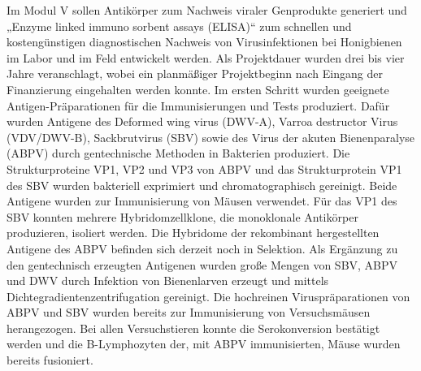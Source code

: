 Im Modul V sollen Antikörper zum Nachweis viraler Genprodukte generiert und „Enzyme linked immuno sorbent assays (ELISA)“ zum schnellen und kostengünstigen diagnostischen Nachweis von Virusinfektionen bei Honigbienen im Labor und im Feld entwickelt werden. Als Projektdauer wurden drei bis vier Jahre veranschlagt, wobei ein planmäßiger Projektbeginn nach Eingang der Finanzierung eingehalten werden konnte. Im ersten Schritt wurden geeignete Antigen-Präparationen für die Immunisierungen und Tests produziert. Dafür wurden Antigene des Deformed wing virus (DWV-A), Varroa destructor Virus (VDV/DWV-B), Sackbrutvirus (SBV) sowie des Virus der akuten Bienenparalyse (ABPV) durch gentechnische Methoden in Bakterien produziert. Die Strukturproteine VP1, VP2 und VP3 von ABPV und das Strukturprotein VP1 des SBV wurden bakteriell exprimiert und chromatographisch gereinigt. Beide Antigene wurden zur Immunisierung von Mäusen verwendet. Für das VP1 des SBV konnten mehrere Hybridomzellklone, die monoklonale Antikörper produzieren, isoliert werden. Die Hybridome der rekombinant hergestellten Antigene des ABPV befinden sich derzeit noch in Selektion. Als Ergänzung zu den gentechnisch erzeugten Antigenen wurden große Mengen von SBV, ABPV und DWV durch Infektion von Bienenlarven erzeugt und mittels Dichtegradientenzentrifugation gereinigt. Die hochreinen Viruspräparationen von ABPV und SBV wurden bereits zur Immunisierung von Versuchsmäusen herangezogen. Bei allen Versuchstieren konnte die Serokonversion bestätigt werden und die B-Lymphozyten der, mit ABPV immunisierten, Mäuse wurden bereits fusioniert.